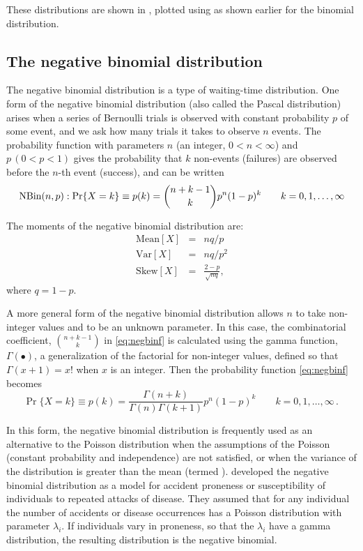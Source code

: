 These distributions are shown in ,
plotted using  as shown earlier for the binomial
distribution.

\subsection{The negative binomial distribution}

The negative binomial distribution is a type of waiting-time distribution.
One form of
the negative binomial distribution
(also called the Pascal distribution) arises when a series of Bernoulli
trials is observed with constant probability $p$ of some event,
and we ask how many trials it takes to observe
$n$ events.
The probability function with parameters $n$ (an integer, $0 < n < \infty$) and $p \, (0 < p < 1)$
gives the probability that $k$ non-events (failures) are observed before
the $n$-th event (success), and
can be written
\begin{equation}\label{eq:negbinf}
\NBin(n,p):   \Pr \{ X = k \} \equiv p(k)  =
  {n+k-1 \choose k} p^n (1-p)^k
  \quad\quad k = 0, 1, \dots , \infty
\end{equation}

The moments of the negative binomial distribution are:
\begin{eqnarray*}
\textrm{Mean}[X] &=&nq / p \\
\textrm{Var}[X] &=&nq / p^2 \\
\textrm{Skew}[X] &=&\frac{2-p}{\sqrt{nq}}
\comma
\end{eqnarray*}
where $q=1-p$.

A more general form of the negative binomial distribution
allows $n$ to take non-integer values and to be an unknown
parameter.
In this case, the combinatorial coefficient,
${n+k-1 \choose k}$ in \eqref{eq:negbinf} is calculated using
the gamma function, $\Gamma(\bullet)$,
a generalization of the factorial for non-integer values,
defined so that $\Gamma(x+1) = x!$ when $x$ is an integer.
Then the probability function \eqref{eq:negbinf} becomes
\begin{equation}\label{eq:negbinf2}
  \Pr \{ X = k \} \equiv p(k)  =
  \frac{\Gamma(n+k)}{\Gamma(n) \Gamma(k+1)}
   p^n (1-p)^k
  \quad\quad k = 0, 1, \dots , \infty
  \period
\end{equation}

In this form, the negative binomial distribution is frequently used
as an alternative to the Poisson distribution when the assumptions
of the Poisson (constant probability and independence) are not
satisfied, or when the variance of the distribution is greater
than the mean (termed ).
\citet{GreenwoodYule:20}
developed the negative binomial distribution as a model for
accident proneness or susceptibility of individuals to
repeated attacks of disease.
They assumed that for any individual the number of accidents
or disease occurrences has a Poisson distribution with parameter
$\lambda_i$.
If individuals vary in proneness, so that the $\lambda_i$ have
a gamma distribution, the resulting distribution is the
negative binomial.

